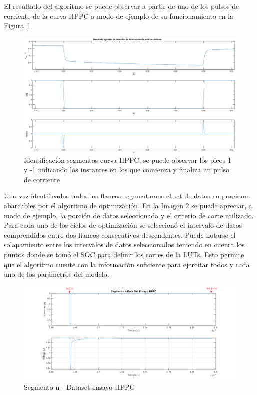 \documentclass[10pt,a4paper]{article}
\begin{document}
El resultado del algoritmo se puede observar a partir de uno de los pulsos de
corriente de la curva \acrshort{HPPC} a modo de ejemplo de su funcionamiento en
la Figura \ref{flank_seg_hppc}

\begin{figure}[h!]
    \begin{center}
        \includegraphics[width=.8\textwidth]{flank_seg_hppc.eps}
        \caption{Identificación segmentos curva
        \acrshort{HPPC}, se puede observar los picos 1 y -1 indicando los
        instantes en los que comienza y finaliza un pulso de corriente}
        \label{flank_seg_hppc}
    \end{center}
\end{figure}
\FloatBarrier

Una vez identificados todos los flancos segmentamos el set de datos en porciones
abarcables por el algoritmo de optimización. En la Imagen
\ref{fig:data_seg_hppc} se puede apreciar, a modo de ejemplo, la porción de
datos seleccionada y el criterio de corte utilizado. Para cada uno de los ciclos
de optimización se seleccionó el intervalo de datos comprendidos entre dos
flancos consecutivos descendentes. Puede notarse el solapamiento entre los
intervalos de datos seleccionados teniendo en cuenta los puntos donde se tomó el
\acrshort{SOC} para definir los cortes de la \acrshort{LUT}s. Esto permite que
el algoritmo cuente con la información suficiente para ejercitar todos y cada
uno de los parámetros del modelo.

\begin{figure}[h!]
    \centering
        \includegraphics[width=1\textwidth]{data_seg_hppc.png}
        \caption{Segmento n - Dataset ensayo \acrshort{HPPC}}
        \label{fig:data_seg_hppc}
\end{figure}
\FloatBarrier
\end{document}
